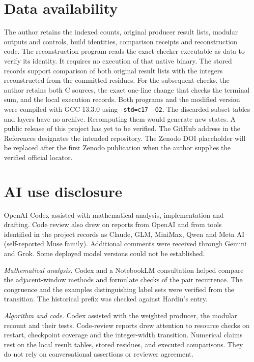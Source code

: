 \documentclass[11pt]{article}
\begin{document}
\section*{Data availability}
The author retains the indexed counts, original producer result lists,
modular outputs and controls, build identities, comparison receipts and
reconstruction code. The reconstruction program reads the exact checker
executable as data to verify its identity. It requires no execution of
that native binary. The stored records support comparison of both original
result lists with the integers reconstructed from the committed residues.
For the subsequent checks, the author retains both C sources, the exact
one-line change that checks the terminal sum, and the local execution
records. Both programs and the modified version were compiled with
GCC 13.3.0 using \texttt{-std=c17 -O2}.
The discarded subset tables and layers have no archive. Recomputing them
would generate new states. A public release of this project
has yet to be verified. The GitHub address in the References designates
the intended repository. The Zenodo DOI placeholder will be replaced
after the first Zenodo publication when the author supplies the verified
official locator.

\section*{AI use disclosure}
OpenAI Codex assisted with mathematical analysis, implementation and
drafting. Code review also drew on reports from OpenAI and from tools
identified in the project records as Claude, GLM, MiniMax, Qwen and
Meta AI (self-reported Muse family). Additional comments were received through Gemini and
Grok. Some deployed model versions could not be established.

\noindent\textit{Mathematical analysis.}
Codex and a NotebookLM consultation helped compare the adjacent-window
methods and formulate checks of the pair recurrence. The congruence and
the examples distinguishing label sets were verified from the transition.
The historical prefix was checked against Hardin's entry.

\noindent\textit{Algorithm and code.}
Codex assisted with the weighted producer, the modular recount and
their tests. Code-review reports drew attention to resource checks on
restart, checkpoint coverage and the integer-width transition. Numerical
claims rest on the local result tables, stored residues, and executed
comparisons. They do not rely on conversational assertions or reviewer
agreement.
\end{document}
